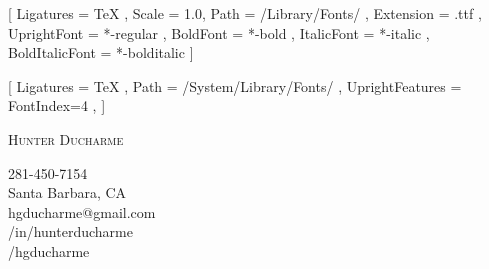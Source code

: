 \documentclass[11pt, a4paper, roman]{letter}
\begin{document}



[
    Ligatures = TeX ,
    Scale = 1.0,
    Path = /Library/Fonts/ ,
    Extension = .ttf ,
    UprightFont = *-regular ,
    BoldFont = *-bold ,
    ItalicFont = *-italic ,
    BoldItalicFont = *-bolditalic
]


\newfontfamily{}[
    Ligatures = TeX ,
    Path = /System/Library/Fonts/ ,
    UprightFeatures = {FontIndex=4} ,
]

\newcommand\lightfont[1]{{\HelveticaLight#1}}

\setmainfont{Helvetica}

\pagestyle{empty}
\raggedbottom

\begin{minipage}[t]{0.5\textwidth}
    \vspace*{\fill}
    \textsc{{\TimesNewRoman \Huge Hunter Ducharme}}
    \vspace*{\fill}
\end{minipage}\hfill
\begin{minipage}[t]{0.3\textwidth}
    \setlength{\baselineskip}{15pt}
    \RaggedLeft 
    \faMobile{} 281-450-7154\\
    \faHome{} Santa Barbara, CA\\ 
    \faEnvelope {} hgducharme@gmail.com\\ 
    \faLinkedinSquare{} /in/hunterducharme\\
    \faGithub{} /hgducharme
\end{minipage}
\end{document}
